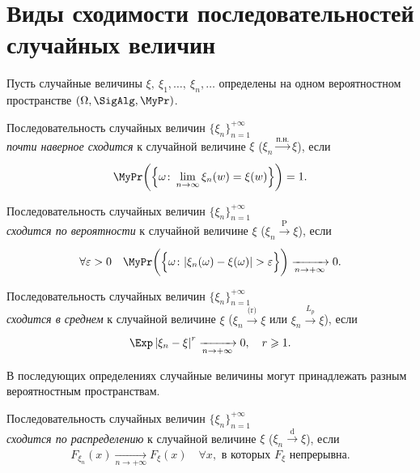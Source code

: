 \section{Виды сходимости последовательностей случайных величин}
Пусть случайные величины $\xi, \: \xi_1, \ldots, \: \xi_n, \ldots$ определены на одном вероятностном пространстве $\left(\Omega, \SigAlg, \MyPr\right)$.

\begin{defn}
    Последовательность случайных величин $\{\xi_n\}_{n = 1}^{+\infty}$ \\ 
    \textit{почти наверное сходится} к случайной величине $\xi$ ($\xi_n \xrightarrow[]{\text{п.н.}} \xi$), если
    \begin{equation*}
        \MyPr\biggl(\left\{\omega \colon \lim\limits _{n \to \infty} \xi_{n}(w)=\xi(w)\right\}\biggr)=1.
    \end{equation*}
\end{defn}

\begin{defn}
    Последовательность случайных величин $\{\xi_n\}_{n = 1}^{+\infty}$ \\
    \textit{сходится по вероятности} к случайной величине $\xi$ ($\xi_n \xrightarrow[]{\text{P}} \xi$), если
    \begin{equation*}
        \forall \varepsilon>0 \quad \MyPr \biggl( \Bigl\{ \omega \colon |\xi_{n}(\omega)-\xi(\omega)|>\varepsilon \Bigr\} \biggr) \xrightarrow[n \to +\infty]{} 0.
    \end{equation*}
\end{defn}

\begin{defn}
    Последовательность случайных величин $\{\xi_n\}_{n=1}^{+\infty}$ \\
    \textit{сходится в среднем} к случайной величине $\xi$ ($\xi_n \xrightarrow[]{\text{(r)}} \xi$ или $\xi_n \xrightarrow[]{L_p} \xi$), если
    \begin{equation*}
        \Exp \left|\xi_{n}-\xi\right|^{r} \xrightarrow[n \to +\infty]{} 0, \quad r \geqslant 1.
    \end{equation*}
\end{defn}

В последующих определениях случайные величины могут принадлежать разным вероятностным пространствам.
\begin{defn}
    Последовательность случайных величин $\{\xi_n\}_{n=1}^{+\infty}$ \\
    \textit{сходится по распределению} к случайной величине $\xi$ ($\xi_n \xrightarrow[]{\text{d}} \xi$), если
    \begin{equation*}
        F_{\xi_n}(x) \xrightarrow[n \to +\infty]{} F_{\xi}(x) \quad \forall x, \text{ в которых } F_{\xi} \text{ непрерывна}.
    \end{equation*}
\end{defn}

